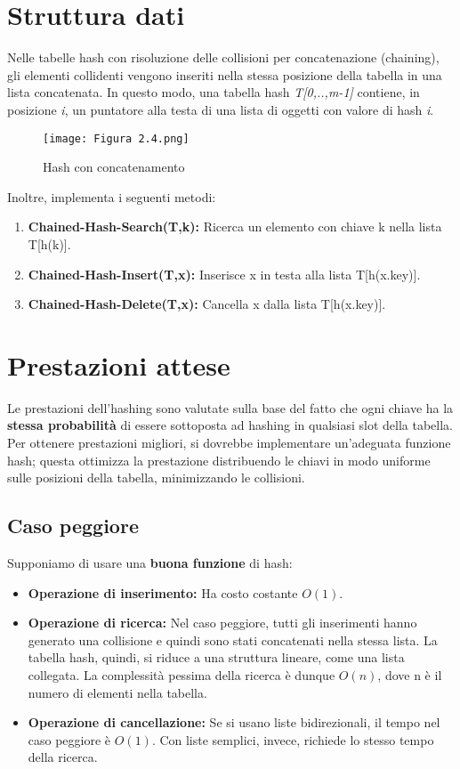 \documentclass{article}
\begin{document}
\section{Struttura dati}
Nelle tabelle hash con risoluzione delle collisioni per concatenazione (chaining), gli elementi collidenti vengono inseriti nella stessa posizione della tabella in una lista concatenata.
In questo modo, una tabella hash \textit{T[0,..,m-1]} contiene, in
posizione \textit{i}, un puntatore alla testa di una lista di oggetti con valore di hash \textit{i}.
\clearpage
\begin{figure}[!hb]
        \centering
        \texttt{[image: Figura 2.4.png]}
        \caption{Hash con concatenamento}
        \label{fig:Figura2.4}
\end{figure}

Inoltre, implementa i seguenti metodi:
\begin{enumerate}[label={\roman*.)}, ref={\roman*.)}]
    \item \textbf{Chained-Hash-Search(T,k):} Ricerca un elemento con chiave k nella lista T[h(k)].
    \item \textbf{Chained-Hash-Insert(T,x):} Inserisce x in testa alla lista T[h(x.key)].
    \item \textbf{Chained-Hash-Delete(T,x):} Cancella x dalla lista T[h(x.key)].
\end{enumerate}

\section{Prestazioni attese}
Le prestazioni dell'hashing sono valutate sulla base del fatto che ogni chiave ha la \textbf{stessa probabilità} di essere sottoposta ad hashing in qualsiasi slot della tabella.
Per ottenere prestazioni migliori, si dovrebbe implementare un'adeguata funzione hash; questa ottimizza la prestazione distribuendo le chiavi in modo uniforme sulle posizioni della tabella, minimizzando le collisioni.

 \subsection{Caso peggiore}
Supponiamo di usare una \textbf{buona funzione} di hash:
\begin{itemize}
    \item \textbf{Operazione di inserimento:} Ha costo costante $O(1)$.
    \item \textbf{Operazione di ricerca:} Nel caso peggiore, tutti gli inserimenti hanno generato una collisione e quindi sono stati concatenati nella stessa lista. La tabella hash, quindi, si riduce a una struttura lineare, come una lista collegata.
    La complessità pessima della ricerca è dunque $O(n)$, dove n è il numero di elementi nella tabella.
    \item \textbf{Operazione di cancellazione:} Se si usano liste bidirezionali, il tempo nel caso peggiore è $O(1)$.
    Con liste semplici, invece, richiede lo stesso tempo della ricerca.
\end{itemize}
\end{document}
